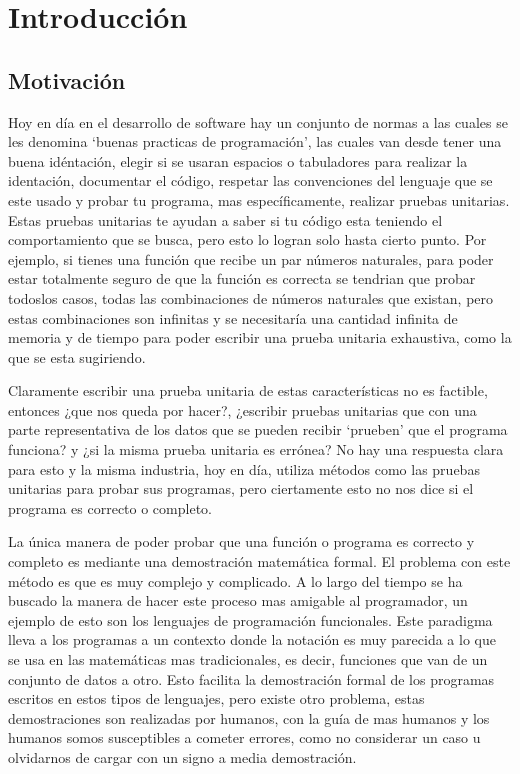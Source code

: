 \documentclass[8pt,leqno,pdflatex,spanish]{book}
\theoremstyle{plain}
\theoremstyle{definition}
\theoremstyle{remark}
\begin{document}
\chapter{Introducción} 

\section{Motivación}
Hoy en día en el desarrollo de software hay un conjunto de normas a las cuales se les denomina 
`buenas practicas de programaci\'on', las cuales van desde tener una buena idéntaci\'on, elegir si 
se usaran espacios o tabuladores para realizar la identaci\'on, documentar el c\'odigo, respetar 
las convenciones del lenguaje que se este usado y probar tu programa, mas específicamente, 
realizar pruebas unitarias. 
Estas pruebas unitarias te ayudan a saber si tu código esta teniendo el comportamiento que se 
busca, pero esto lo logran solo hasta cierto punto. Por ejemplo, si tienes una funci\'on que 
recibe un par números naturales, para poder estar totalmente seguro de que la funci\'on es 
correcta se tendrian que probar todoslos casos, todas las combinaciones de números naturales que 
existan, pero estas combinaciones son infinitas y se necesitaría una cantidad infinita de memoria 
y de tiempo para poder escribir una prueba unitaria exhaustiva, como la que se esta sugiriendo.

Claramente escribir una prueba unitaria de estas características no es factible, entonces ¿que nos 
queda por hacer?, ¿escribir pruebas unitarias que con una parte representativa de los datos que se 
pueden recibir `prueben' que el programa funciona? y ¿si la misma prueba unitaria es errónea? No 
hay una respuesta clara para esto y la misma industria, hoy en día, utiliza métodos como las 
pruebas unitarias para probar sus programas, pero ciertamente esto no nos dice si el programa es 
correcto o completo.

La única manera de poder probar que una función o programa es correcto y completo es mediante una 
demostraci\'on matemática formal. El problema con este método es que es muy complejo y complicado. 
A lo largo del tiempo se ha buscado la manera de hacer este proceso mas amigable al programador, 
un ejemplo de esto son los lenguajes de programación funcionales. Este paradigma lleva a los 
programas a un contexto donde la notaci\'on es muy parecida a lo que se usa en las matemáticas mas 
tradicionales, es decir, funciones que van de un conjunto de datos a otro. Esto facilita la 
demostraci\'on formal de los programas escritos en estos tipos de lenguajes, pero existe otro 
problema, estas demostraciones son realizadas por humanos, con la guía de mas humanos y los 
humanos somos susceptibles a cometer errores, como no considerar un caso u olvidarnos de cargar 
con un signo a media demostraci\'on. 
\end{document}
